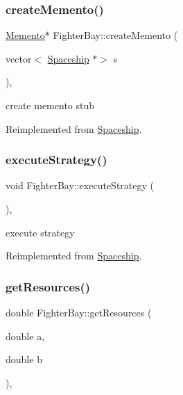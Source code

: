 \subsubsection{\texorpdfstring{create\+Memento()}{createMemento()}}
{\footnotesize\ttfamily \hyperlink{classMemento}{Memento}$\ast$ Fighter\+Bay\+::create\+Memento (\begin{DoxyParamCaption}\item[{vector$<$ \hyperlink{classSpaceship}{Spaceship} $\ast$$>$}]{s }\end{DoxyParamCaption})\hspace{0.3cm}{\ttfamily [inline]}, {\ttfamily [virtual]}}

create memento stub 

Reimplemented from \hyperlink{classSpaceship_a6d272f846b019dec8226ddab65648a7b}{Spaceship}.

\mbox{\label{classFighterBay_ae450be19e2e5233e36031db1f7b17503}} 
\subsubsection{\texorpdfstring{execute\+Strategy()}{executeStrategy()}}
{\footnotesize\ttfamily void Fighter\+Bay\+::execute\+Strategy (\begin{DoxyParamCaption}{ }\end{DoxyParamCaption})\hspace{0.3cm}{\ttfamily [inline]}, {\ttfamily [virtual]}}

execute strategy 

Reimplemented from \hyperlink{classSpaceship}{Spaceship}.

\mbox{\label{classFighterBay_ae6071df768f59aeeab67f7b2bb1cce52}} 
\subsubsection{\texorpdfstring{get\+Resources()}{getResources()}}
{\footnotesize\ttfamily double Fighter\+Bay\+::get\+Resources (\begin{DoxyParamCaption}\item[{double}]{a,  }\item[{double}]{b }\end{DoxyParamCaption})\hspace{0.3cm}{\ttfamily [inline]}, {\ttfamily [virtual]}}

